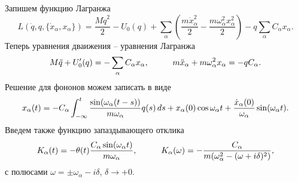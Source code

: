 Запишем функцию Лагранжа
\begin{equation*}
	L(\dot{q}, q, \{\dot{x}_\alpha, x_\alpha\}) = \frac{M \dot{q}^2}{2} - U_0 (q) + \sum_\alpha \left(
		\frac{m \dot{x}_\alpha^2}{2} - \frac{m \omega_\alpha^2 x_\alpha^2}{2}
	\right) - q \sum_\alpha C_\alpha x_\alpha.
\end{equation*}
Теперь уравнения дваижения -- уравнения Лагранжа
\begin{equation*}
	M \ddot{q} + U'_0 (q) = - \sum_\alpha C_\alpha x_\alpha,
	\hspace{10 mm} 
	m \ddot{x}_\alpha + m \omega^2_\alpha x_\alpha = - q C_\alpha.
\end{equation*}
Решение для фононов можем записать в виде
\begin{equation*}
	x_\alpha(t) = - C_\alpha \int_{-\infty}^{t} \frac{\sin (\omega_\alpha (t-s))}{m \omega_\alpha} q(s) \, d s + 
	x_\alpha(0) \cos \omega_\alpha t + \frac{\dot{x}_\alpha(0)}{\omega_\alpha} \sin (\omega_\alpha t).
\end{equation*}
Введем также функцию запаздывающего отклика
\begin{equation*}
	K_\alpha(t) = - \theta(t) \frac{C_\alpha \sin (\omega_\alpha t)}{m \omega_\alpha},
	\hspace{10 mm} 
	K_\alpha(\omega) = - \frac{C_\alpha}{m(\omega_\alpha^2 - (\omega+i \delta)^2)},
\end{equation*}
с полюсами $\omega = \pm \omega_\alpha - i \delta$, $\delta \to +0$. 

